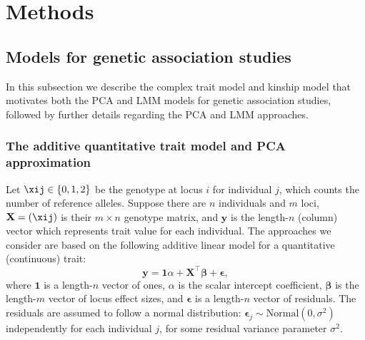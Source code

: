 \documentclass[11pt]{article}
\begin{document}

\section{Methods}

\subsection{Models for genetic association studies}

In this subsection we describe the complex trait model and kinship model that motivates both the PCA and LMM models for genetic association studies, followed by further details regarding the PCA and LMM approaches.

\subsubsection{The additive quantitative trait model and PCA approximation}

Let $\xij \in \{ 0, 1, 2 \}$ be the genotype at locus $i$ for individual $j$, which counts the number of reference alleles.
Suppose there are $n$ individuals and $m$ loci,
$\mathbf{X} = ( \xij )$ is their $m \times n$ genotype matrix, and
$\mathbf{y}$ is the length-$n$ (column) vector which represents trait value for each individual.
The approaches we consider are based on the following additive linear model for a quantitative (continuous) trait:
\begin{equation}
  \label{eq:trait}
  \mathbf{y}
  =
  \mathbf{1} \alpha + \mathbf{X}^\intercal \mathbf{\beta} + \mathbf{\epsilon}
  ,
\end{equation}
where
$\mathbf{1}$ is a length-$n$ vector of ones,
$\alpha$ is the scalar intercept coefficient,
$\mathbf{\beta}$ is the length-$m$ vector of locus effect sizes, and
$\mathbf{\epsilon}$ is a length-$n$ vector of residuals.
The residuals are assumed to follow a normal distribution: $\mathbf{\epsilon}_j \sim \text{Normal}(0, \sigma^2)$ independently for each individual $j$, for some residual variance parameter $\sigma^2$.
\end{document}
